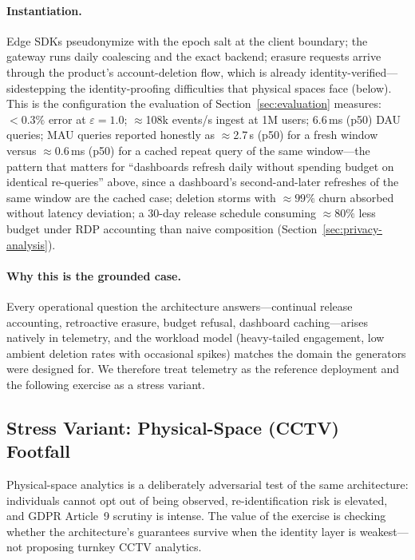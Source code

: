 \documentclass[sigconf,anonymous,review]{acmart}
\begin{document}
\paragraph{Instantiation.} Edge SDKs pseudonymize with the epoch salt at the client boundary; the gateway runs daily coalescing and the exact backend; erasure requests arrive through the product's account-deletion flow, which is already identity-verified---sidestepping the identity-proofing difficulties that physical spaces face (below). This is the configuration the evaluation of Section~\ref{sec:evaluation} measures: ${<}0.3\%$ error at $\varepsilon = 1.0$; $\approx$108k events/s ingest at 1M users; 6.6\,ms (p50) DAU queries; MAU queries reported honestly as $\approx$2.7\,s (p50) for a fresh window versus $\approx$0.6\,ms (p50) for a cached repeat query of the same window---the pattern that matters for ``dashboards refresh daily without spending budget on identical re-queries'' above, since a dashboard's second-and-later refreshes of the same window are the cached case; deletion storms with ${\approx}99\%$ churn absorbed without latency deviation; a 30-day release schedule consuming ${\approx}80\%$ less budget under RDP accounting than naive composition (Section~\ref{sec:privacy-analysis}).

\paragraph{Why this is the grounded case.} Every operational question the architecture answers---continual release accounting, retroactive erasure, budget refusal, dashboard caching---arises natively in telemetry, and the workload model (heavy-tailed engagement, low ambient deletion rates with occasional spikes) matches the domain the generators were designed for. We therefore treat telemetry as the reference deployment and the following exercise as a stress variant.

\subsection{Stress Variant: Physical-Space (CCTV) Footfall}
\label{sec:cctv-case}

Physical-space analytics is a deliberately adversarial test of the same architecture: individuals cannot opt out of being observed, re-identification risk is elevated, and GDPR Article~9 scrutiny is intense. The value of the exercise is checking whether the architecture's guarantees survive when the identity layer is weakest---not proposing turnkey CCTV analytics.
\end{document}
